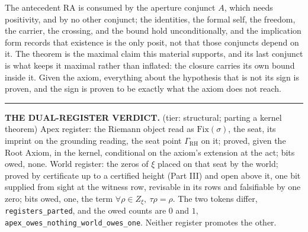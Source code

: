 \documentclass[10pt]{article}
\newenvironment{jbox}{\par\vspace{2pt}\noindent\color{accent}\rule{\columnwidth}{0.8pt}\par\vspace{-2pt}\small}{\par\vspace{2pt}}
\begin{document}
The antecedent \(\mathrm{RA}\) is consumed by the aperture conjunct
\(A\), which needs positivity, and by no other conjunct; the identities,
the formal self, the freedom, the carrier, the crossing, and the bound
hold unconditionally, and the implication form records that existence is
the only posit, not that those conjuncts depend on it. The theorem is
the maximal claim this material supports, and its last conjunct is what
keeps it maximal rather than inflated: the closure carries its own bound
inside it. Given the axiom, everything about the hypothesis that is not
its sign is proven, and the sign is proven to be exactly what the axiom
does not reach.

\begin{jbox}
\textbf{THE DUAL-REGISTER VERDICT.} (tier: structural; parting a kernel theorem) Apex register: the Riemann object read as $\mathrm{Fix}(\sigma)$, the seat, its imprint on the grounding reading, the seat point $\Gamma_{\mathrm{RH}}$ on it; proved, given the Root Axiom, in the kernel, conditional on the axiom's extension at the act; bits owed, none. World register: the zeros of $\xi$ placed on that seat by the world; proved by certificate up to a certified height (Part III) and open above it, one bit supplied from sight at the witness row, revisable in its rows and falsifiable by one zero; bits owed, one, the term $\forall \rho \in Z_\xi,\ \tau\rho = \rho$. The two tokens differ, \texttt{registers\_\allowbreak parted}, and the owed counts are $0$ and $1$, \texttt{apex\_\allowbreak owes\_\allowbreak nothing\_\allowbreak world\_\allowbreak owes\_\allowbreak one}. Neither register promotes the other.
\end{jbox}
\end{document}
